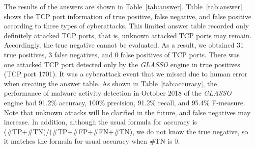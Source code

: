 \documentclass[conference]{IEEEtran}
\begin{document}
The results of the answers are shown in Table~\ref{tab:answer}.
Table~\ref{tab:answer} shows the TCP port information of true positive, false negative, and false positive according to three types of cyberattacks.
This limited answer table recorded only definitely attacked TCP ports, that is, unknown attacked TCP ports may remain.
Accordingly, the true negative cannot be evaluated.
As a result, we obtained 31 true positives, 3 false negatives, and 0 false positives of TCP ports.
There was one attacked TCP port detected only by the \textit{GLASSO} engine in true positives (TCP port 1701).
It was a cyberattack event that we missed due to human error when creating the answer table.
As shown in Table~\ref{tab:accuracy}, the performance of malware activity detection in October 2018 of the \textit{GLASSO} engine had 91.2\% accuracy, 100\% precision, 91.2\% recall, and 95.4\% F-measure.
Note that unknown attacks will be clarified in the future, and false negatives may increase.
In addition, although the usual formula for accuracy is (\#TP+\#TN)/(\#TP+\#FP+\#FN+\#TN), we do not know the true negative, so it matches the formula for usual accuracy when \#TN is 0.
\end{document}

